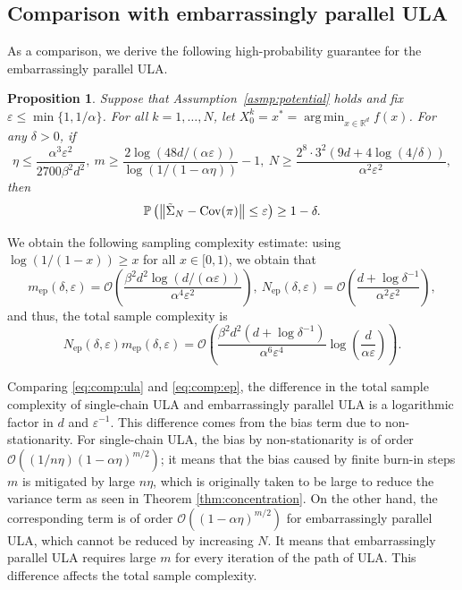 \documentclass[12pt,reqno]{amsart}
\newtheorem{proposition}[theorem]{Proposition}
\theoremstyle{remark}
\theoremstyle{definition}
\newcommand{\calO}{\mathcal{O}}
\newcommand{\R}{\mathbb{R}}
\renewcommand{\Pr}{\mathbb{P}}
\newcommand{\Cov}{\textnormal{Cov}}
\renewcommand{\epsilon}{\varepsilon}
\DeclareMathOperator*{\argmin}{arg\,min}
\begin{document}
\subsection{Comparison with embarrassingly parallel ULA}
As a comparison, we derive the following high-probability guarantee for the embarrassingly parallel ULA.
\begin{proposition}\label{prop:comp:ep}
    Suppose that Assumption~\ref{asmp:potential} holds and fix $\epsilon\le \min\{1,1/\alpha\}$.
    For all $k=1,\ldots,N$, let $X_{0}^{k}=x^{\ast}=\argmin_{x\in\R^{d}}f(x)$.
    For any $\delta>0$, if 
    \begin{equation*}
        \eta\le \frac{\alpha^{3}\epsilon^{2}}{2700\beta^{2}d^{2}},\ m\ge \frac{2\log(48d/(\alpha\epsilon) )}{\log\left(1/(1-\alpha\eta)\right)}-1,\ N\ge \frac{2^{8}\cdot 3^{2}(9d+4\log(4/\delta))}{\alpha^{2}\epsilon^{2}},
    \end{equation*}
    then 
    \begin{equation*}
        \Pr\left(\left\|\tilde{\Sigma}_{N}-\Cov(\pi)\right\|\le \epsilon\right)\ge 1-\delta.
    \end{equation*}
\end{proposition}
We obtain the following sampling complexity estimate: using $\log(1/(1-x))\ge x$ for all $x\in[0,1)$, we obtain that
\begin{equation*}
    m_{\text{ep}}(\delta,\epsilon)=\calO\left(\frac{\beta^{2}d^{2}\log\left(d/(\alpha\epsilon)\right)}{\alpha^{4}\epsilon^{2}}\right),\ N_{\text{ep}}(\delta,\epsilon)=\calO\left(\frac{d+\log \delta^{-1}}{\alpha^{2}\epsilon^{2}}\right),
\end{equation*}
and thus, the total sample complexity is
\begin{equation}\label{eq:comp:ep}
    N_{\text{ep}}(\delta,\epsilon)m_{\text{ep}}(\delta,\epsilon)=\calO\left(\frac{\beta^{2}d^{2}(d+\log \delta^{-1})}{\alpha^{6}\epsilon^{4}}\log\left(\frac{d}{\alpha\epsilon}\right)\right).
\end{equation}

Comparing \eqref{eq:comp:ula} and \eqref{eq:comp:ep}, the difference in the total sample complexity of single-chain ULA and embarrassingly parallel ULA is a logarithmic factor in $d$ and $\epsilon^{-1}$.
This difference comes from the bias term due to non-stationarity.
For single-chain ULA, the bias by non-stationarity is of order $\calO((1/n\eta)(1-\alpha\eta)^{m/2})$; it means that the bias caused by finite burn-in steps $m$ is mitigated by large $n\eta$, which is originally taken to be large to reduce the variance term as seen in Theorem \ref{thm:concentration}.
On the other hand, the corresponding term is of order $\calO((1-\alpha\eta)^{m/2})$ for embarrassingly parallel ULA, which cannot be reduced by increasing $N$.
It means that embarrassingly parallel ULA requires large $m$ for every iteration of the path of ULA.
This difference affects the total sample complexity.
\end{document}
